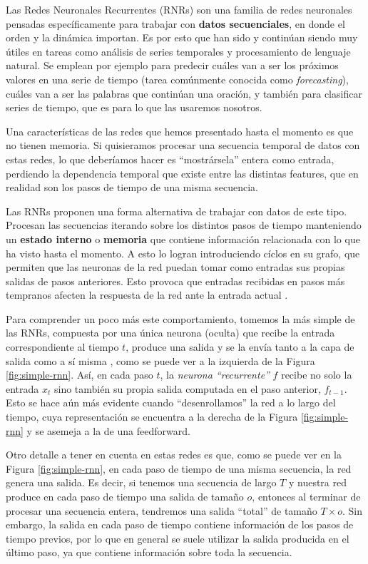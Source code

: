 \documentclass[../../main.tex]{subfiles}
\begin{document}
Las Redes Neuronales Recurrentes (RNRs) son una familia de redes neuronales pensadas
específicamente para trabajar con \textbf{datos secuenciales}, en donde el orden y la
dinámica importan. Es por esto que han sido y continúan siendo muy útiles en tareas como
análisis de series temporales y procesamiento de lenguaje natural. Se emplean por ejemplo
para predecir cuáles van a ser los próximos valores en una serie de tiempo (tarea
comúnmente conocida como \textit{forecasting}), cuáles van a ser las palabras que
continúan una oración, y también para clasificar series de tiempo, que es para lo que las
usaremos nosotros.

Una características de las redes que hemos presentado hasta el momento es que no tienen
memoria. Si quisieramos procesar una secuencia temporal de datos con estas redes, lo que
deberíamos hacer es ``mostrársela'' entera como entrada, perdiendo la dependencia temporal
que existe entre las distintas features, que en realidad son los pasos de tiempo de una
misma secuencia.

Las RNRs proponen una forma alternativa de trabajar con datos de este tipo. Procesan las
secuencias iterando sobre los distintos pasos de tiempo manteniendo un \textbf{estado
interno} o \textbf{memoria} que contiene información relacionada con lo que ha visto hasta
el momento\footnotemark. A esto lo logran introduciendo cíclos en su grafo, que permiten
que las neuronas de la red puedan tomar como entradas sus propias salidas de pasos
anteriores. Esto provoca que entradas recibidas en pasos más tempranos afecten la
respuesta de la red ante la entrada actual \cite{ai-a-modern-approach} .

Para comprender un poco más este comportamiento, tomemos la más simple de las RNRs,
compuesta por una única neurona (oculta) que recibe la entrada correspondiente al tiempo
\(t\), produce una salida y se la envía tanto a la capa de salida como a sí misma
\cite{hands-on-ML-sklearn-tf}, como se puede ver a la izquierda de la Figura
\ref{fig:simple-rnn}. Así, en cada paso \(t\), la \textit{neurona ``recurrente''} \(f\)
recibe no solo la entrada \(x_t\) sino también su propia salida computada en el paso
anterior, \(f_{t-1}\). Esto se hace aún más evidente cuando ``desenrollamos'' la red a lo
largo del tiempo, cuya representación se encuentra a la derecha de la Figura
\ref{fig:simple-rnn} y se asemeja a la de una feedforward.

Otro detalle a tener en cuenta en estas redes es que, como se puede ver en la Figura
\ref{fig:simple-rnn}, en cada paso de tiempo de una misma secuencia, la red genera una
salida. Es decir, si tenemos una secuencia de largo \(T\) y nuestra red produce en cada
paso de tiempo una salida de tamaño \(o\), entonces al terminar de procesar una secuencia
entera, tendremos una salida ``total'' de tamaño \(T \times o\). Sin embargo,
la salida en cada paso de tiempo contiene información de los pasos de tiempo previos,
por lo que en general se suele utilizar la salida producida en el último paso, ya
que contiene información sobre toda la secuencia.
\end{document}
